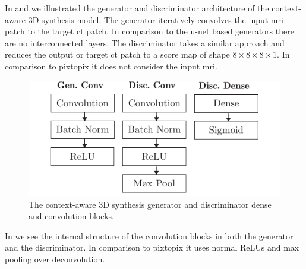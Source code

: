 In  and  we illustrated the
generator and discriminator architecture of the context-aware 3D synthesis
model. The generator iteratively convolves the input \gls{mri} patch to the
target \gls{ct} patch. In comparison to the u-net based generators there
are no interconnected layers. The discriminator takes a similar approach and
reduces the output or target \gls{ct} patch to a score map of shape
$8\times8\times8\times1$. In comparison to pixtopix it does not consider the
input \gls{mri}.
\begin{figure}[h]
  \centering
  \includegraphics[width=\linewidth]{figure/synthesis-blocks.pdf}
  \caption{The context-aware 3D synthesis generator and discriminator dense
    and convolution blocks.
	}\label{fig:synthesis:blocks}
\end{figure}
In  we see the internal structure of the
convolution blocks in both the generator and the discriminator. In comparison
to pixtopix it uses normal ReLUs and max pooling over deconvolution.
